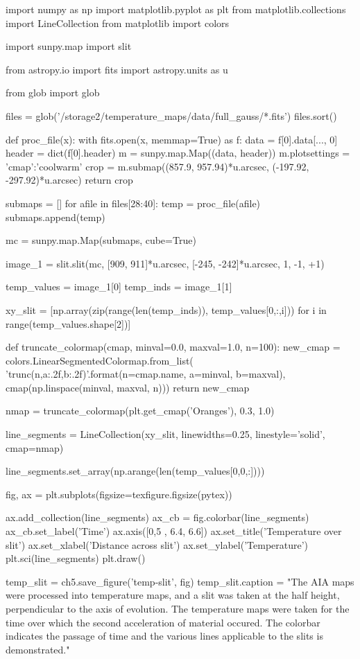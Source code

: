 \begin{pycode}[chapter5]
import numpy as np
import matplotlib.pyplot as plt
from matplotlib.collections import LineCollection
from matplotlib import colors

import sunpy.map
import slit

from astropy.io import fits
import astropy.units as u

from glob import glob

files = glob('/storage2/temperature_maps/data/full_gauss/*.fits')
files.sort()

def proc_file(x):
    with fits.open(x, memmap=True) as f:
        data = f[0].data[..., 0]
        header = dict(f[0].header)
        m = sunpy.map.Map((data, header))
        m.plotsettings = {'cmap':'coolwarm'}
        crop = m.submap((857.9, 957.94)*u.arcsec,
                 (-197.92, -297.92)*u.arcsec)
    return crop 


submaps = []
for afile in files[28:40]:
    temp = proc_file(afile)
    submaps.append(temp)

mc = sunpy.map.Map(submaps, cube=True)


image_1 = slit.slit(mc, [909, 911]*u.arcsec, [-245, -242]*u.arcsec, 1, -1, +1)

temp_values = image_1[0]
temp_inds = image_1[1]


xy_slit = [np.array(zip(range(len(temp_inds)), temp_values[0,:,i])) for i in range(temp_values.shape[2])]

def truncate_colormap(cmap, minval=0.0, maxval=1.0, n=100):
    new_cmap = colors.LinearSegmentedColormap.from_list(
        'trunc({n},{a:.2f},{b:.2f})'.format(n=cmap.name, a=minval, b=maxval),
        cmap(np.linspace(minval, maxval, n)))
    return new_cmap

nmap = truncate_colormap(plt.get_cmap('Oranges'), 0.3, 1.0)

line_segments = LineCollection(xy_slit,
                               linewidths=0.25,
                               linestyle='solid',
                               cmap=nmap)

line_segments.set_array(np.arange(len(temp_values[0,0,:])))

fig, ax = plt.subplots(figsize=texfigure.figsize(pytex))


ax.add_collection(line_segments)
ax_cb = fig.colorbar(line_segments)
ax_cb.set_label('Time')
ax.axis([0,5 , 6.4, 6.6])
ax.set_title('Temperature over slit')
ax.set_xlabel('Distance across slit')
ax.set_ylabel('Temperature')
plt.sci(line_segments)
plt.draw()

temp_slit = ch5.save_figure('temp-slit', fig)
temp_slit.caption = "The AIA maps were processed into temperature maps, and a slit was taken at the half height, perpendicular to the axis of evolution. The temperature maps were taken for the time over which the second acceleration of material occured. The colorbar indicates the passage of time and the various lines applicable to the slits is demonstrated."


\end{pycode}

